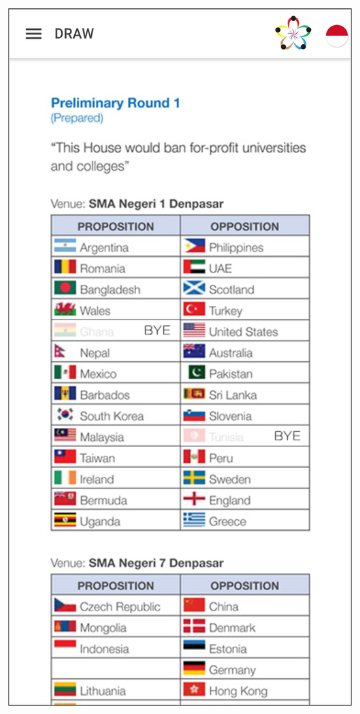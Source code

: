 \begin{figure}[H]
     \centering
     \begin{subfigure}[b]{0.3\textwidth}
         \centering
         \includegraphics[width=\textwidth]{Gambar/SSDraw.png}

\end{subfigure}
\end{figure}

